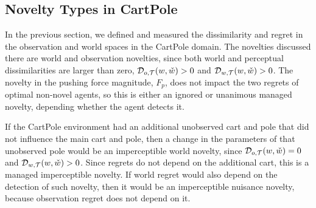 \subsection{Novelty Types in CartPole}

In the previous section, we defined and measured the dissimilarity and regret in the observation and world spaces in the CartPole domain. 
The novelties discussed there are world and observation novelties, since both world and perceptual dissimilarities are larger than zero, ${\cal D}_{o,{\cal T}} (w, \check{w}) >0$ and ${\cal D}_{w,{\cal T}} (w, \check{w}) >0$.
The novelty in the pushing force magnitude, $F_p$, does not impact the two regrets of optimal non-novel agents, so this is either an ignored or unanimous managed novelty, depending whether the agent detects it.
% 
% 

If the CartPole environment had an additional unobserved cart and pole that did not influence the main cart and pole, then a change in the parameters of that unobserved pole would be an imperceptible world novelty, since ${\cal D}_{o,{\cal T}} (w, \check{w}) =0$ and ${\cal D}_{w,{\cal T}} (w, \check{w}) >0$. 
Since regrets do not depend on the additional cart, this is a managed imperceptible novelty.
If world regret would also depend on the detection of such novelty, then it would be an imperceptible nuisance novelty, because observation regret does not depend on it.





